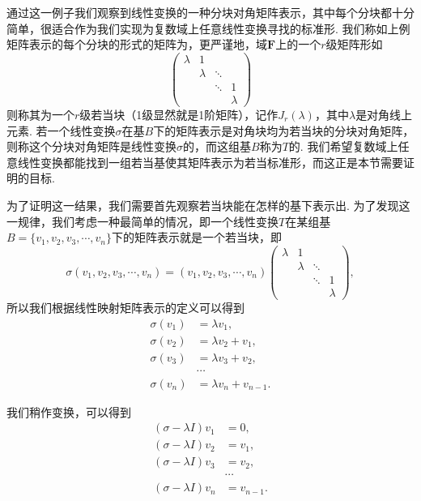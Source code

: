 通过这一例子我们观察到线性变换的一种分块对角矩阵表示，其中每个分块都十分简单，很适合作为我们实现为复数域上任意线性变换寻找的标准形. 我们称如上例矩阵表示的每个分块的形式的矩阵为，更严谨地，域$\mathbf{F}$上的一个$r$级矩阵形如\[\begin{pmatrix}
    \lambda & 1 &        &   \\
      & \lambda & \ddots &   \\
      &   & \ddots & 1 \\
      &   &        & \lambda
\end{pmatrix}\]
则称其为一个$r$级若当块（1级显然就是1阶矩阵），记作$J_r(\lambda)$，其中$\lambda$是对角线上元素. 若一个线性变换$\sigma$在基$B$下的矩阵表示是对角块均为若当块的分块对角矩阵，则称这个分块对角矩阵是线性变换$\sigma$的，而这组基$B$称为$T$的. 我们希望复数域上任意线性变换都能找到一组若当基使其矩阵表示为若当标准形，而这正是本节需要证明的目标.

为了证明这一结果，我们需要首先观察若当块能在怎样的基下表示出. 为了发现这一规律，我们考虑一种最简单的情况，即一个线性变换$T$在某组基$B=\{v_1,v_2,v_3,\cdots,v_n\}$下的矩阵表示就是一个若当块，即
\[\sigma(v_1,v_2,v_3,\cdots,v_n)=(v_1,v_2,v_3,\cdots,v_n)\begin{pmatrix}
    \lambda & 1 &        &   \\
      & \lambda & \ddots &   \\
      &   & \ddots & 1 \\
      &   &        & \lambda
\end{pmatrix},\]
所以我们根据线性映射矩阵表示的定义可以得到
\begin{align*}
    \sigma(v_1)&=\lambda v_1,\\
    \sigma(v_2)&=\lambda v_2+v_1,\\
    \sigma(v_3)&=\lambda v_3+v_2,\\
    &\cdots\\
    \sigma(v_n)&=\lambda v_n+v_{n-1}.
\end{align*}

我们稍作变换，可以得到
\begin{equation} \label{eq:17:若当基的推导}
    \begin{aligned}
        (\sigma-\lambda I)v_1&=0,\\
        (\sigma-\lambda I)v_2&=v_1,\\
        (\sigma-\lambda I)v_3&=v_2,\\
        &\cdots\\
        (\sigma-\lambda I)v_n&=v_{n-1}.
    \end{aligned}
\end{equation}

